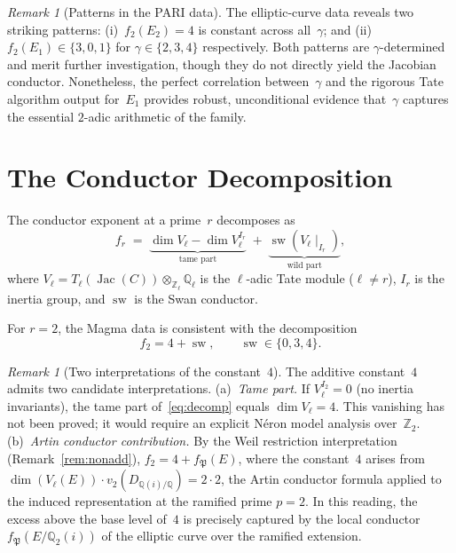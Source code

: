 \documentclass[11pt,a4paper]{article}
\newcommand{\Jac}{\operatorname{Jac}}
\newcommand{\sw}{\operatorname{sw}}
\theoremstyle{definition}
\theoremstyle{remark}
\newtheorem{remark}[theorem]{Remark}
\begin{document}
\begin{remark}[Patterns in the PARI data]
\label{rem:pari_pattern}
  The elliptic-curve data reveals two striking patterns:
  (i)~$f_2(E_2) = 4$ is constant across all~$\gamma$; and
  (ii)~$f_2(E_1) \in \{3, 0, 1\}$ for
  $\gamma \in \{2, 3, 4\}$ respectively.
  Both patterns are $\gamma$-determined and merit further
  investigation, though they do not directly yield the
  Jacobian conductor.
  Nonetheless, the perfect correlation between~$\gamma$
  and the rigorous Tate algorithm output for~$E_1$
  provides robust, unconditional evidence that~$\gamma$
  captures the essential $2$-adic arithmetic of the family.
\end{remark}


\section{The Conductor Decomposition}\label{sec:decomp}

The conductor exponent at a prime~$r$ decomposes as
\begin{equation}\label{eq:decomp}
  f_r \;=\; \underbrace{\dim V_\ell
    - \dim V_\ell^{I_r}}_{\text{tame part}}
  \;+\; \underbrace{\sw(V_\ell \mid_{I_r})}_{\text{wild part}},
\end{equation}
where $V_\ell = T_\ell(\Jac(C)) \otimes_{\mathbb{Z}_\ell}
\mathbb{Q}_\ell$ is the $\ell$-adic Tate module
($\ell \ne r$),
$I_r$ is the inertia group, and $\sw$ is the Swan
conductor.

For $r = 2$, the Magma data is consistent with the
decomposition
\begin{equation}\label{eq:swan}
  f_2 = 4 + \sw, \qquad
  \sw \in \{0, 3, 4\}.
\end{equation}

\begin{remark}[Two interpretations of the constant~$4$]
\label{rem:four}
  The additive constant~$4$ admits two candidate
  interpretations.
  (a)~\emph{Tame part.} If $V_\ell^{I_2} = 0$
  (no inertia invariants), the tame part of~\eqref{eq:decomp}
  equals $\dim V_\ell = 4$.  This vanishing has not been
  proved; it would require an explicit N\'eron model
  analysis over~$\mathbb{Z}_2$.
  (b)~\emph{Artin conductor contribution.}
  By the Weil restriction interpretation
  (Remark~\ref{rem:nonadd}), $f_2 = 4 + f_{\mathfrak{P}}(E)$,
  where the constant~$4$ arises from
  $\dim(V_\ell(E)) \cdot v_2(D_{\mathbb{Q}(i)/\mathbb{Q}}) = 2 \cdot 2$,
  the Artin conductor formula applied to the induced
  representation at the ramified prime $p = 2$.
  In this reading, the excess above the base level of~$4$
  is precisely captured by the local conductor
  $f_{\mathfrak{P}}(E/\mathbb{Q}_2(i))$ of the elliptic
  curve over the ramified extension.
\end{remark}
\end{document}
